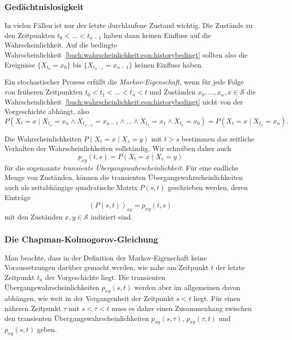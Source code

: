 \subsubsection{Gedächtnislosigkeit}
%
In vielen Fällen ist nur der letzte durchlaufene Zustand wichtig.
Die Zustände zu den Zeitpunkten $t_0<\dots<t_{n-1}$ haben dann keinen
Einfluss auf die Wahrscheinlichkeit.
Auf die bedingte
Wahrscheinlichkeit~\eqref{buch:wahrscheinlichkeit:eqn:historybedingt}
sollten also die Ereignisse $\{X_{t_0}=x_0\}$ bis $\{X_{t_{n-1}}=x_{n-1}\}$
keinen Einfluss haben.

\begin{definition}
Ein stochastischer Prozess erfüllt die {\em Markov-Eigenschaft}, wenn 
für jede Folge von früheren Zeitpunkten $t_0<t_1<\dots <t_n<t$ und Zuständen
$x_0,\dots,x_n,x\in \mathcal{S}$ die 
Wahrscheinlichkeit~\eqref{buch:wahrscheinlichkeit:eqn:historybedingt}
nicht von der Vorgeschichte abhängt, also
\[
P(X_t = x\mid
X_{t_n}=x_n\wedge X_{t_{n-1}}=x_{n-1}\wedge\dots\wedge X_{t_1}=x_1\wedge
X_{t_0}=x_0)
=
P(X_t = x \mid
X_{t_n}=x_n).
\]
\end{definition}

Die Wahrscheinlichkeiten $P(X_t=x\mid X_s=y)$ mit $t>s$ bestimmen das
zeitliche Verhalten der Wahrscheinlichkeiten vollständig.
Wir schreiben daher auch
\[
p_{xy}(t, s)
=
P(X_t = x\mid X_s=y)
\]
für die sogenannte {\em transiente Übergangswahrscheinlichkeit}.
%
Für eine endliche Menge von Zuständen, können die transienten
Übergangswahrscheinlichkeiten auch als zeitabhängige 
quadratische Matrix $P(s,t)$ geschrieben werden, deren
Einträge
\[
(P(s,t))_{xy}
=
p_{xy}(t,s)
\]
mit den Zuständen $x,y\in\mathcal{S}$ indiziert sind.

\subsubsection{Die Chapman-Kolmogorov-Gleichung}
%
Man beachte, dass in der Definition der Markov-Eigenschaft
keine Voraussetzungen darüber gemacht werden, wie nahe
am Zeitpunkt $t$ der letzte Zeitpunkt $t_n$ der Vorgeschichte liegt.
Die transienten Übergangswahrscheinlichkeiten $p_{xy}(s,t)$ werden
aber im allgemeinen davon abhängen, wie weit in der Vergangenheit
der Zeitpunkt $s<t$ liegt.
Für einen näheren Zeitpunkt $\tau$ mit $s<\tau <t$ muss es daher
einen Zusammenhang zwischen den transienten Übergangswahrscheinlichkeiten
$p_{xy}(s,\tau)$, $p_{xy}(\tau,t)$ und $p_{xy}(s,t)$ geben.


